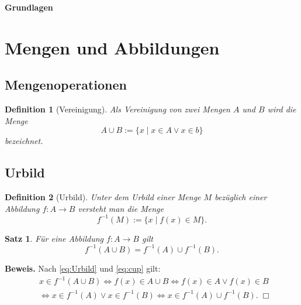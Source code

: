 \documentclass[a4paper,fleqn,11pt]{scrartcl}
\newcommand{\strong}[1]{\textsf{\textbf{#1}}}
\theoremstyle{rmbox}
\newtheorem{definition}{Definition}
\newtheorem{theorem}{Satz}
\begin{document}
\thispagestyle{empty}

\noindent
{\huge\strong{Grundlagen}}

\tableofcontents

\section{Mengen und Abbildungen}

\subsection{Mengenoperationen}

\begin{definition}[Vereinigung]
Als \emph{Vereinigung} von zwei Mengen $A$ und $B$ wird die Menge
\begin{equation}\label{eq:cup}
A\cup B := \{x\mid x\in A\lor x\in b\}
\end{equation}
bezeichnet.
\end{definition}


\subsection{Urbild}

\begin{definition}[Urbild]
Unter dem \emph{Urbild} einer Menge $M$ bezüglich einer
Abbildung $f\colon A\to B$ versteht
man die Menge
\begin{equation}\label{eq:Urbild}
f^{-1}(M) := \{x\mid f(x)\in M\}.
\end{equation}
\end{definition}

\begin{theorem}
Für eine Abbildung $f\colon A\to B$ gilt
\begin{equation}
f^{-1}(A\cup B) = f^{-1}(A)\cup f^{-1}(B).
\end{equation}
\end{theorem}

\noindent
\strong{Beweis.} Nach \eqref{eq:Urbild} und \eqref{eq:cup} gilt:
\begin{align}
&x\in f^{-1}(A\cup B)\iff f(x)\in A\cup B
\iff f(x)\in A\lor f(x)\in B\\
&\iff x\in f^{-1}(A)\lor x\in f^{-1}(B)
\iff x\in f^{-1}(A)\cup f^{-1}(B).\;\Box
\end{align}
\end{document}
